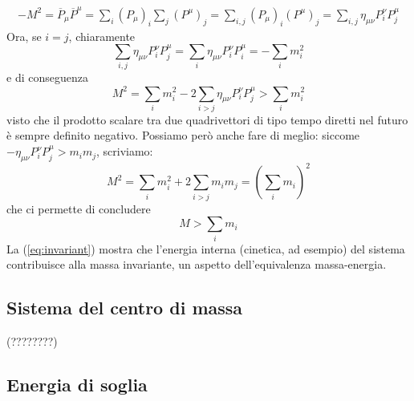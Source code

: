 \documentclass[a4paper,11pt]{book}
\theoremstyle{plain}
\theoremstyle{definition}
\begin{document}
\begin{align*}
-M^2=\overline{P}_{\mu}\overline{P}^{\mu}=\sum_i (P_{\mu})_i \sum_j (P^{\mu})_j=\sum_{i,j}(P_{\mu})_i(P^{\mu})_j=\sum_{i,j}\eta_{\mu\nu}P^{\nu}_iP^{\mu}_j
\end{align*}
Ora, se $i=j$, chiaramente 
\[
\sum_{i,j}\eta_{\mu\nu}P^{\nu}_iP^{\mu}_j=\sum_i \eta_{\mu\nu}P^{\nu}_iP^{\mu}_i=-\sum_i m_i^2
\]
e di conseguenza
\[
M^2 = \sum_i m_i^2 -2\sum_{i>j}\eta_{\mu\nu}P^{\nu}_iP^{\mu}_j>\sum_i m_i^2
\]
visto che il prodotto scalare tra due quadrivettori di tipo tempo diretti nel futuro è sempre definito negativo. Possiamo però anche fare di meglio: siccome $-\eta_{\mu\nu}P^{\nu}_iP^{\mu}_j > m_im_j$, scriviamo:
\[
M^2=\sum_i m_i^2 + 2\sum_{i>j}m_im_j = (\sum_i m_i)^2
\]
che ci permette di concludere
\begin{equation}\label{eq:invariant}
M>\sum_i m_i
\end{equation}
La (\ref{eq:invariant}) mostra che l'energia interna (cinetica, ad esempio) del sistema contribuisce alla massa invariante, un aspetto dell'equivalenza massa-energia. 

\subsection{Sistema del centro di massa}
(????????)

\subsection{Energia di soglia}
\end{document}
